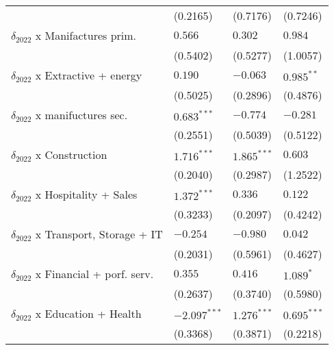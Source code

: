 \begin{tabular}{llll}
                                                   &           (0.2165) &           (0.7176) &           (0.7246) \\
$\delta_{2022}$ x Manifactures prim.               &            $0.566$ &            $0.302$ &            $0.984$ \\
                                                   &           (0.5402) &           (0.5277) &           (1.0057) \\
$\delta_{2022}$ x Extractive + energy              &            $0.190$ &           $-0.063$ &       $0.985^{**}$ \\
                                                   &           (0.5025) &           (0.2896) &           (0.4876) \\
$\delta_{2022}$ x manifuctures sec.                &      $0.683^{***}$ &           $-0.774$ &           $-0.281$ \\
                                                   &           (0.2551) &           (0.5039) &           (0.5122) \\
$\delta_{2022}$ x Construction                     &      $1.716^{***}$ &      $1.865^{***}$ &            $0.603$ \\
                                                   &           (0.2040) &           (0.2987) &           (1.2522) \\
$\delta_{2022}$ x Hospitality + Sales              &      $1.372^{***}$ &            $0.336$ &            $0.122$ \\
                                                   &           (0.3233) &           (0.2097) &           (0.4242) \\
$\delta_{2022}$ x Transport, Storage + IT          &           $-0.254$ &           $-0.980$ &            $0.042$ \\
                                                   &           (0.2031) &           (0.5961) &           (0.4627) \\
$\delta_{2022}$ x Financial + porf. serv.          &            $0.355$ &            $0.416$ &          $1.089^*$ \\
                                                   &           (0.2637) &           (0.3740) &           (0.5980) \\
$\delta_{2022}$ x Education + Health               &     $-2.097^{***}$ &      $1.276^{***}$ &      $0.695^{***}$ \\
                                                   &           (0.3368) &           (0.3871) &           (0.2218) \\

\end{tabular}

